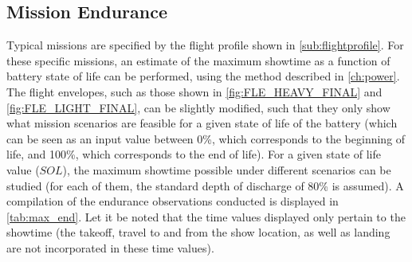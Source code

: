 \subsection{Mission Endurance}
Typical missions are specified by the flight profile shown in \autoref{sub:flightprofile}. For these specific missions, an estimate of the maximum showtime as a function of battery state of life can be performed, using the method described in \autoref{ch:power}. The flight envelopes, such as those shown in \autoref{fig:FLE_HEAVY_FINAL} and \autoref{fig:FLE_LIGHT_FINAL}, can be slightly modified, such that they only show what mission scenarios are feasible for a given state of life of the battery (which can be seen as an input value between 0\%, which corresponds to the beginning of life, and 100\%, which corresponds to the end of life). For a given state of life value ($\mathit{SOL}$), the maximum showtime possible under different scenarios can be studied (for each of them, the standard depth of discharge of 80\% is assumed). A compilation of the endurance observations conducted is displayed in \autoref{tab:max_end}. Let it be noted that the time values displayed only pertain to the showtime (the takeoff, travel to and from the show location, as well as landing are not incorporated in these time values).
